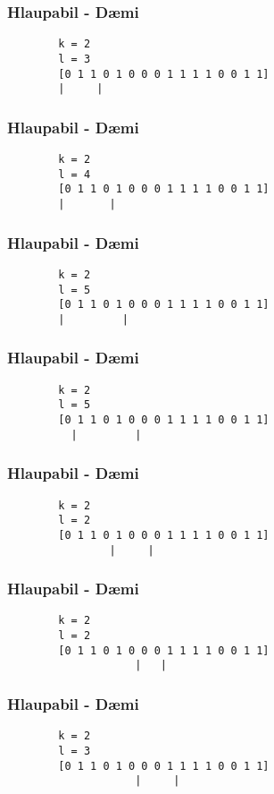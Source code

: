 \documentclass{beamer}
\begin{document}
\begin{frame}[fragile]
	\frametitle{Hlaupabil - Dæmi}
\begin{verbatim}
        k = 2
        l = 3
        [0 1 1 0 1 0 0 0 1 1 1 1 0 0 1 1]
        |     |
\end{verbatim}
\end{frame}
\addtocounter{framenumber}{-1}

\begin{frame}[fragile]
	\frametitle{Hlaupabil - Dæmi}
\begin{verbatim}
        k = 2
        l = 4
        [0 1 1 0 1 0 0 0 1 1 1 1 0 0 1 1]
        |       |
\end{verbatim}
\end{frame}
\addtocounter{framenumber}{-1}

\begin{frame}[fragile]
	\frametitle{Hlaupabil - Dæmi}
\begin{verbatim}
        k = 2
        l = 5
        [0 1 1 0 1 0 0 0 1 1 1 1 0 0 1 1]
        |         |
\end{verbatim}
\end{frame}
\addtocounter{framenumber}{-1}

\begin{frame}[fragile]
	\frametitle{Hlaupabil - Dæmi}
\begin{verbatim}
        k = 2
        l = 5
        [0 1 1 0 1 0 0 0 1 1 1 1 0 0 1 1]
          |         |
\end{verbatim}
\end{frame}
\addtocounter{framenumber}{-1}

\begin{frame}[fragile]
	\frametitle{Hlaupabil - Dæmi}
\begin{verbatim}
        k = 2
        l = 2
        [0 1 1 0 1 0 0 0 1 1 1 1 0 0 1 1]
                |     |
\end{verbatim}
\end{frame}
\addtocounter{framenumber}{-1}

\begin{frame}[fragile]
	\frametitle{Hlaupabil - Dæmi}
\begin{verbatim}
        k = 2
        l = 2
        [0 1 1 0 1 0 0 0 1 1 1 1 0 0 1 1]
                    |   |
\end{verbatim}
\end{frame}
\addtocounter{framenumber}{-1}

\begin{frame}[fragile]
	\frametitle{Hlaupabil - Dæmi}
\begin{verbatim}
        k = 2
        l = 3
        [0 1 1 0 1 0 0 0 1 1 1 1 0 0 1 1]
                    |     |
\end{verbatim}
\end{frame}
\addtocounter{framenumber}{-1}
\end{document}
